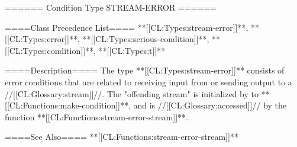 ====== Condition Type STREAM-ERROR ======

====Class Precedence List==== **[[CL:Types:stream-error]]**, **[[CL:Types:error]]**, **[[CL:Types:serious-condition]]**, **[[CL:Types:condition]]**, **[[CL:Types:t]]**

====Description====
The type **[[CL:Types:stream-error]]** consists of error conditions that are related to receiving input from or sending output to a //[[CL:Glossary:stream]]//. The "offending stream" is initialized by  to **[[CL:Functions:make-condition]]**, and is //[[CL:Glossary:accessed]]// by the function **[[CL:Functions:stream-error-stream]]**.

====See Also====
**[[CL:Functions:stream-error-stream]]**

